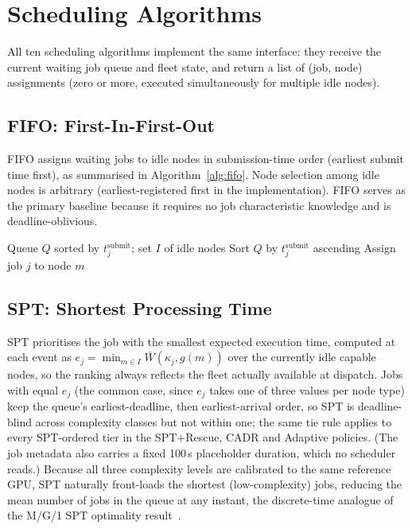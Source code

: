 \section{Scheduling Algorithms}
\label{sec:scheduling-algorithms}

All ten scheduling algorithms implement the same interface: they receive the current waiting job queue and fleet state, and return a list of (job, node) assignments (zero or more, executed simultaneously for multiple idle nodes).

\subsection{FIFO: First-In-First-Out}
\label{ssec:fifo-first-in-first-out}

FIFO assigns waiting jobs to idle nodes in submission-time order (earliest submit time first), as summarised in Algorithm~\ref{alg:fifo}. Node selection among idle nodes is arbitrary (earliest-registered first in the implementation). FIFO serves as the primary baseline because it requires no job characteristic knowledge and is deadline-oblivious.

\begin{algorithm}[H]
\caption{FIFO Scheduler}
\label{alg:fifo}
\begin{algorithmic}[1]
\REQUIRE Queue $Q$ sorted by $t_j^{\text{submit}}$; set $I$ of idle nodes
\STATE Sort $Q$ by $t_j^{\text{submit}}$ ascending
  \STATE Assign job $j$ to node $m$
\ENDFOR
\end{algorithmic}
\end{algorithm}




\subsection{SPT: Shortest Processing Time}
\label{ssec:spt-shortest-processing-time}

SPT prioritises the job with the smallest expected execution time, computed at each event as $e_j = \min_{m \in I} \overline{W}(\kappa_j, g(m))$ over the currently idle capable nodes, so the ranking always reflects the fleet actually available at dispatch. Jobs with equal $e_j$ (the common case, since $e_j$ takes one of three values per node type) keep the queue's earliest-deadline, then earliest-arrival order, so SPT is deadline-blind across complexity classes but not within one; the same tie rule applies to every SPT-ordered tier in the SPT+Rescue, CADR and Adaptive policies. (The job metadata also carries a fixed 100\,s placeholder duration, which no scheduler reads.) Because all three complexity levels are calibrated to the same reference GPU, SPT naturally front-loads the shortest (low-complexity) jobs, reducing the mean number of jobs in the queue at any instant, the discrete-time analogue of the M/G/1 SPT optimality result~\cite{pinedo2016scheduling}.

